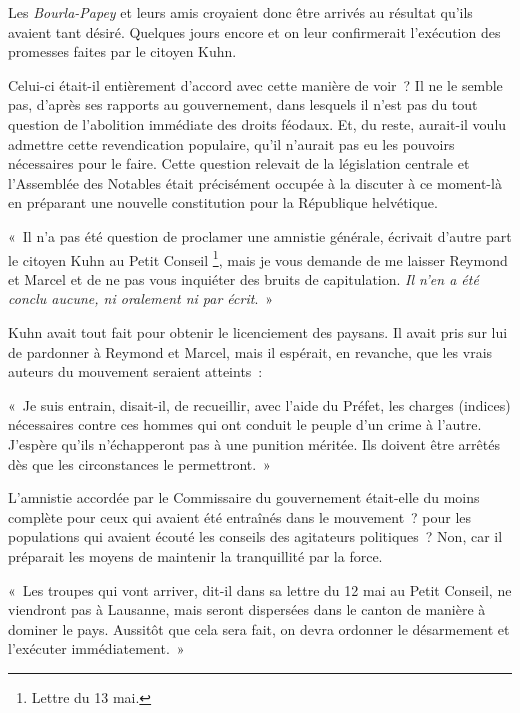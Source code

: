 \documentclass[french,twoside]{book} %
\newenvironment{quoteblock}%
  {\begin{quoting}}
  {\end{quoting}}
\newenvironment{quotebar}{%
    \def\FrameCommand{{\color{rubric!10!}\vrule width 0.5em} \hspace{0.9em}}%
    \def\OuterFrameSep{\itemsep} %
    \MakeFramed {\advance\hsize-\width \FrameRestore}
  }%
  {%
    \endMakeFramed
  }
\renewenvironment{quoteblock}%
  {%
    \savenotes
    \setstretch{0.9}
    \normalfont
    \begin{quotebar}
  }
  {%
    \end{quotebar}
    \spewnotes
  }
\begin{document}
\noindent Les \emph{Bourla-Papey} et leurs amis croyaient donc être arrivés au résultat qu’ils avaient tant désiré. Quelques jours encore et on leur confirmerait l’exécution des promesses faites par le citoyen Kuhn.\par
Celui-ci était-il entièrement d’accord avec cette manière de voir ? Il ne le semble pas, d’après ses rapports au gouvernement, dans lesquels il n’est pas du tout question de l’abolition immédiate des droits féodaux. Et, du reste, aurait-il voulu admettre cette revendication populaire, qu’il n’aurait pas eu les pouvoirs nécessaires pour le faire. Cette question relevait de la législation centrale et l’Assemblée des Notables était précisément occupée à la discuter à ce moment-là en préparant une nouvelle constitution pour la République helvétique.\par

\begin{quoteblock}
 \noindent « Il n’a pas été question de proclamer une amnistie générale, écrivait d’autre part le citoyen Kuhn au Petit Conseil \footnote{Lettre du 13 mai.}, mais je vous demande de me laisser Reymond et Marcel et de ne pas vous inquiéter des bruits de capitulation. \emph{Il n’en a été conclu aucune, ni oralement ni par écrit}. »
 \end{quoteblock}

\noindent Kuhn avait tout fait pour obtenir le licenciement des paysans. Il avait pris sur lui de pardonner à Reymond et Marcel, mais il espérait, en revanche, que les vrais auteurs du mouvement seraient atteints :\par

\begin{quoteblock}
 \noindent « Je suis entrain, disait-il, de recueillir, avec l’aide du Préfet, les charges (indices) nécessaires contre ces hommes qui ont conduit le peuple d’un crime à l’autre. J’espère qu’ils n’échapperont pas à une punition méritée. Ils doivent être arrêtés dès que les circonstances le permettront. »
 \end{quoteblock}

\noindent L’amnistie accordée par le Commissaire du gouvernement était-elle du moins complète pour ceux qui avaient été entraînés dans le mouvement ? pour les populations qui avaient écouté les conseils des agitateurs politiques ? Non, car il préparait les moyens de maintenir la tranquillité par la force.\par

\begin{quoteblock}
 \noindent « Les troupes qui vont arriver, dit-il dans sa lettre du 12 mai au Petit Conseil, ne viendront pas à Lausanne, mais seront dispersées dans le canton de manière à dominer le pays. Aussitôt que cela sera fait, on devra ordonner le désarmement et l’exécuter immédiatement. »
 \end{quoteblock}
\end{document}

